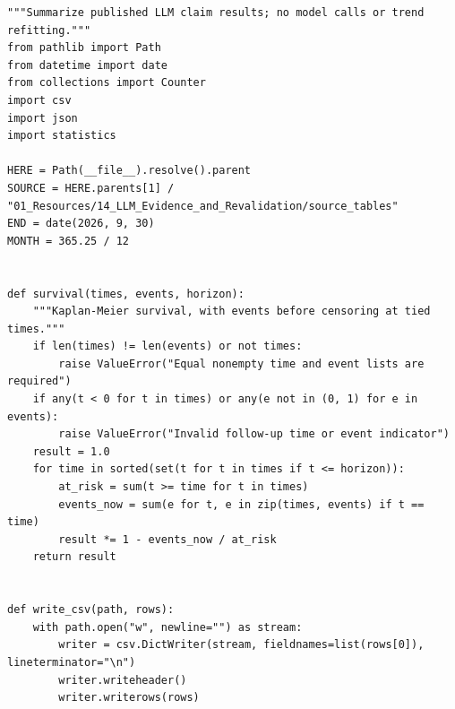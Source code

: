 \begin{Verbatim}[breaklines,breakanywhere,fontsize=\small]
"""Summarize published LLM claim results; no model calls or trend refitting."""
from pathlib import Path
from datetime import date
from collections import Counter
import csv
import json
import statistics

HERE = Path(__file__).resolve().parent
SOURCE = HERE.parents[1] / "01_Resources/14_LLM_Evidence_and_Revalidation/source_tables"
END = date(2026, 9, 30)
MONTH = 365.25 / 12


def survival(times, events, horizon):
    """Kaplan-Meier survival, with events before censoring at tied times."""
    if len(times) != len(events) or not times:
        raise ValueError("Equal nonempty time and event lists are required")
    if any(t < 0 for t in times) or any(e not in (0, 1) for e in events):
        raise ValueError("Invalid follow-up time or event indicator")
    result = 1.0
    for time in sorted(set(t for t in times if t <= horizon)):
        at_risk = sum(t >= time for t in times)
        events_now = sum(e for t, e in zip(times, events) if t == time)
        result *= 1 - events_now / at_risk
    return result


def write_csv(path, rows):
    with path.open("w", newline="") as stream:
        writer = csv.DictWriter(stream, fieldnames=list(rows[0]), lineterminator="\n")
        writer.writeheader()
        writer.writerows(rows)



\end{Verbatim}
